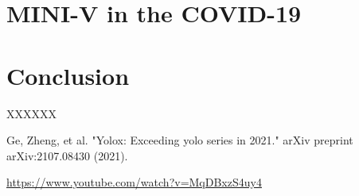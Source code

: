 \documentclass[lettersize,journal]{IEEEtran}
\begin{document}
\section{MINI-V in the COVID-19}


\section{Conclusion}
XXXXXX
\begin{thebibliography}{1}


  Ge, Zheng, et al. "Yolox: Exceeding yolo series in 2021." arXiv preprint arXiv:2107.08430 (2021).

  \url{https://www.youtube.com/watch?v=MqDBxzS4uy4}

\end{thebibliography}

\vfill
\end{document}
